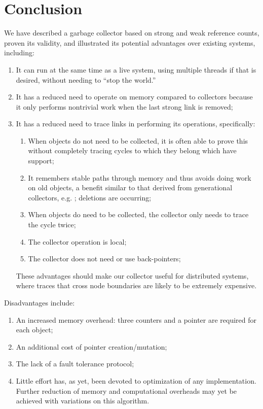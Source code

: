 \section{Conclusion}
\label{section:conclusion}
We have described a garbage collector based on strong and weak reference counts,
proven its validity,
and illustrated its potential advantages over existing systems, including:
\begin{enumerate}
\item It can run at the same time as a live system, using multiple threads if that
is desired, without needing to ``stop the world.''
\item It has a reduced need to operate on memory compared to collectors because
it only performs nontrivial work when the last strong link is removed;
\item It has a reduced need to trace links in performing its operations, specifically:
\begin{enumerate}
\item When objects do not need to be collected, it is often able to prove this
without completely tracing cycles to which they belong which have support;
\item It remembers stable paths through memory and thus avoids doing work on old objects,
a benefit similar to that derived from generational collectors, e.g. \cite{Printezis:2000};
deletions are occurring;
\item When objects do need to be collected, the collector only needs to trace the cycle twice;
\item The collector operation is local;
\item The collector does not need or use back-pointers;
\end{enumerate}
These advantages should make our collector useful for distributed systems, where traces that
cross node boundaries are likely to be extremely expensive.
\end{enumerate}

Disadvantages include:
\begin{enumerate}
\item An increased memory overhead: three counters and a pointer are required
for each object;
\item An additional cost of pointer creation/mutation;
\item The lack of a fault tolerance protocol;
\item Little effort has, as yet, been devoted to optimization of any implementation. Further reduction of memory and computational overheads may yet be achieved with variations on this algorithm.
\end{enumerate}

